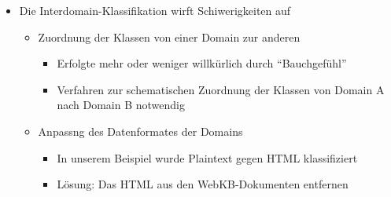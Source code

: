 \begin{frame}[c]
\begin{itemize}
  \item Die Interdomain-Klassifikation wirft Schiwerigkeiten auf
  \begin{itemize}
  \item Zuordnung der Klassen von einer Domain zur anderen
  \begin{itemize}
  \item Erfolgte mehr oder weniger willkürlich durch ``Bauchgefühl''
  \item Verfahren zur schematischen Zuordnung der Klassen von Domain A nach Domain B notwendig
\end{itemize}
  \item Anpassng des Datenformates der Domains
  \begin{itemize}
  \item In unserem Beispiel wurde Plaintext gegen HTML klassifiziert
  \item Lösung: Das HTML aus den WebKB-Dokumenten entfernen
\end{itemize}
  
\end{itemize}
  \end{itemize}
\end{frame}
